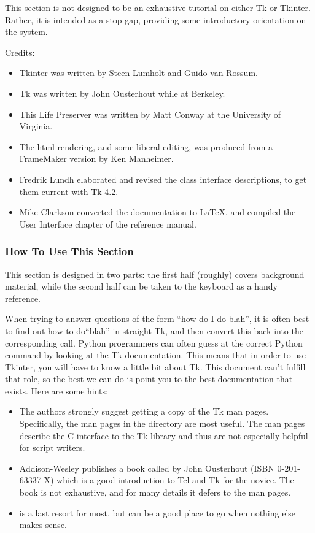 This section is not designed to be an exhaustive tutorial on either
Tk or Tkinter.  Rather, it is intended as a stop gap, providing some
introductory orientation on the system.

Credits:
\begin{itemize}
\item   Tkinter was written by Steen Lumholt and Guido van Rossum.
\item   Tk was written by John Ousterhout while at Berkeley.
\item   This Life Preserver was written by Matt Conway at
the University of Virginia.
\item   The html rendering, and some liberal editing, was
produced from a FrameMaker version by Ken Manheimer.
\item   Fredrik Lundh elaborated and revised the class interface descriptions,
to get them current with Tk 4.2.
\item  Mike Clarkson converted the documentation to \LaTeX, and compiled the 
User Interface chapter of the reference manual.
\end{itemize}


\subsubsection{How To Use This Section}

This section is designed in two parts: the first half (roughly) covers
background material, while the second half can be taken to the
keyboard as a handy reference.

When trying to answer questions of the form ``how do I do blah'', it
is often best to find out how to do``blah'' in straight Tk, and then
convert this back into the corresponding  call.
Python programmers can often guess at the correct Python command by
looking at the Tk documentation. This means that in order to use
Tkinter, you will have to know a little bit about Tk. This document
can't fulfill that role, so the best we can do is point you to the
best documentation that exists. Here are some hints:

\begin{itemize}
\item   The authors strongly suggest getting a copy of the Tk man
pages. Specifically, the man pages in the  directory are most
useful. The  man pages describe the C interface to the Tk
library and thus are not especially helpful for script writers.  

\item   Addison-Wesley publishes a book called  by John Ousterhout (ISBN 0-201-63337-X) which is a good
introduction to Tcl and Tk for the novice.  The book is not
exhaustive, and for many details it defers to the man pages. 

\item   {} is a last resort for most, but can be a good
place to go when nothing else makes sense.  
\end{itemize}

